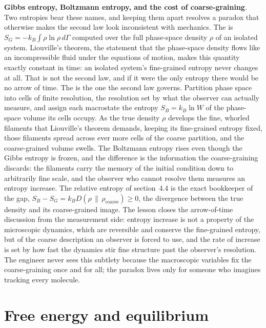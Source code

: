 \begin{mastery}
\textbf{Gibbs entropy, Boltzmann entropy, and the cost of coarse-graining}. Two
entropies bear these names, and keeping them apart resolves a paradox that
otherwise makes the second law look inconsistent with mechanics. The
 is $S_G = -k_B\int \rho\ln\rho\,d\Gamma$
computed over the full phase-space density $\rho$ of an isolated system. Liouville's
theorem, the statement that the phase-space density flows like an incompressible
fluid under the equations of motion, makes this quantity exactly constant in
time: an isolated system's fine-grained entropy never changes at all. That is not
the second law, and if it were the only entropy there would be no arrow of time.
The  is the one the second law governs.
Partition phase space into cells of finite resolution, the resolution set by what
the observer can actually measure, and assign each macrostate the entropy $S_B =
k_B \ln W$ of the phase-space volume its cells occupy. As the true density $\rho$
develops the fine, whorled filaments that Liouville's theorem demands, keeping
its fine-grained entropy fixed, those filaments spread across ever more cells of
the coarse partition, and the coarse-grained volume swells. The Boltzmann
entropy rises even though the Gibbs entropy is frozen, and the difference is the
information the coarse-graining discards: the filaments carry the memory of the
initial condition down to arbitrarily fine scale, and the observer who cannot
resolve them measures an entropy increase. The relative entropy of section~4.4 is
the exact bookkeeper of the gap, $S_B - S_G = k_B D(\rho\,\|\,\rho_{\text{coarse}})
\ge 0$, the divergence between the true density and its coarse-grained image. The
lesson closes the arrow-of-time discussion from the measurement side: entropy
increase is not a property of the microscopic dynamics, which are reversible and
conserve the fine-grained entropy, but of the coarse description an observer is
forced to use, and the rate of increase is set by how fast the dynamics stir
fine structure past the observer's resolution. The engineer never sees this
subtlety because the macroscopic variables fix the coarse-graining once and for
all; the paradox lives only for someone who imagines tracking every molecule.
\end{mastery}

\section{Free energy and equilibrium}

